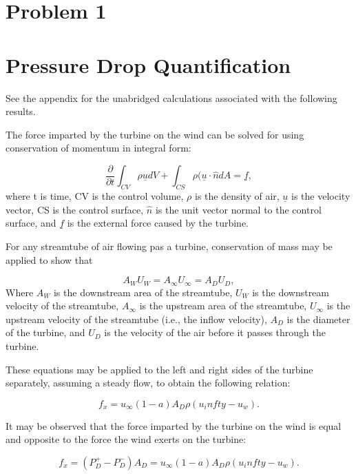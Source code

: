 \documentclass{article}
\begin{document}
\section{Problem 1}
\section{Pressure Drop Quantification}
See the appendix for the unabridged calculations associated with the following results.

The force imparted by the turbine on the wind can be solved for using conservation of momentum in integral form:

\begin{equation}
\frac{\partial}{\partial t} \int_{CV} \rho \underline{u} dV + \int_{CS} \rho (\underline{u} \cdot \hat{n} dA = \underline{f},
\end{equation}
where t is time, CV is the control volume, $\rho$ is the density of air, $\underline{u}$ is the velocity vector, CS is the control surface, $\hat{n}$ is the unit vector normal to the control surface, and $\underline{f}$ is the external force caused by the turbine.

For any streamtube of air flowing pas a turbine, conservation of mass may be applied to show that

\begin{equation}
A_W U_W = A_\infty U_\infty = A_D U_D,
\end{equation}
Where $A_W$ is the downstream area of the streamtube, $U_W$ is the downstream velocity of the streamtube, $A_\infty$ is the upstream area of the streamtube, $U_\infty$ is the upstream velocity of the streamtube (i.e., the inflow velocity), $A_D$ is the diameter of the turbine, and $U_D$ is the velocity of the air before it passes through the turbine.

These equations may be applied to the left and right sides of the turbine separately, assuming a steady flow, to obtain the following relation:

\begin{equation}
f_x = u_\infty (1-a)A_D\rho (u_infty - u_w).
\end{equation}

It may be observed that the force imparted by the turbine on the wind is equal and opposite to the force the wind exerts on the turbine:

\begin{equation}
f_x = (P_D^+ - P_D^-)A_D = u_\infty (1-a)A_D\rho (u_infty - u_w).
\end{equation}
\end{document}
